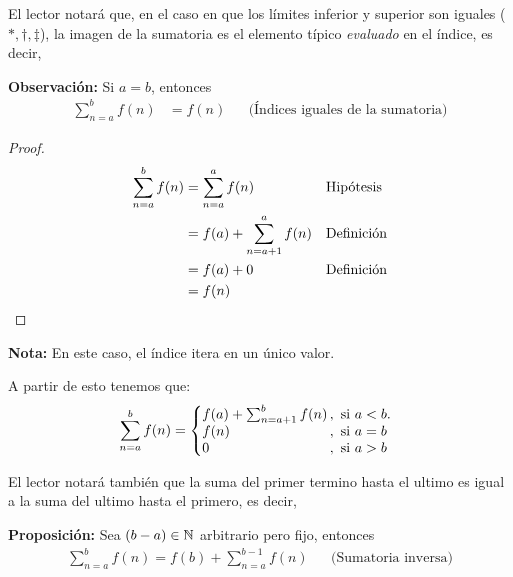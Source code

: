  El lector notará que, en el caso en que los límites inferior y superior son iguales ($*, \dag, \ddag$), la imagen de la sumatoria es el elemento típico \textit{evaluado} en el índice, es decir,

  \textbf{Observación:} Si $a=b$, entonces
  \begin{align*}
    \sum_{n=a}^{b} f(n) &= f(n) && \text{(Índices iguales de la sumatoria)}
  \end{align*}

  \begin{proof}\leavevmode
  \begin{align*}
    \sum_{n=a}^{b} f(n) &= \sum_{n=a}^{a} f(n) && \text{Hipótesis}\\
    &= f(a) + \sum_{n=a+1}^{a} f(n) && \text{Definición}\\
    &= f(a) + 0 && \text{Definición}\\
    &= f(n) && \qedhere
  \end{align*}
  \end{proof}

  \textbf{Nota:} En este caso, el índice itera en un único valor.

  A partir de esto tenemos que:
  \[
    \sum_{n=a}^{b} f(n) = \left\{
    \begin{array}{@{}l@{\thinspace}l}
    f(a) + \sum_{n=a+1}^{b} f(n) &,  \ \text{si}  \ a<b.\\
    f(n) &,  \ \text{si}  \ a=b\\
    0 &,  \ \text{si}  \ a>b
    \end{array} \right. \]

    El lector notará también que la suma del primer termino hasta el ultimo es
    igual a la suma del ultimo hasta el primero, es decir,

    \textbf{Proposición:} Sea $(b-a)\in \mathbb{N}$ arbitrario pero fijo, entonces
    \begin{align*}
      \sum_{n=a}^{b} f(n) = f(b) + \sum_{n=a}^{b-1} f(n) && \text{(Sumatoria inversa)}
    \end{align*}

